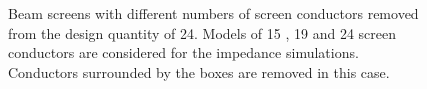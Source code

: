 \begin{figure}
\caption{Beam screens with different numbers of screen conductors removed from the design quantity of 24. Models of 15 , 19  and 24  screen conductors are considered for the impedance simulations. Conductors surrounded by the boxes are removed in this case.}
\label{fig:mki-take-away-cond-together}
\end{figure}

